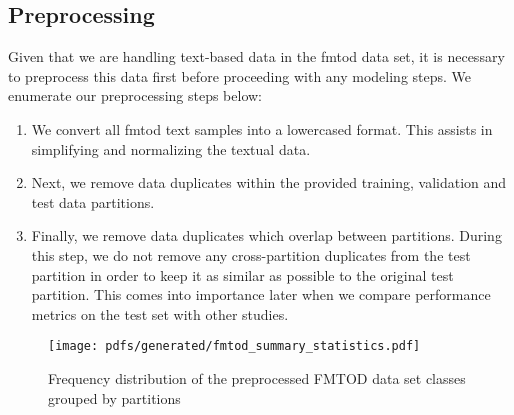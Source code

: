 \subsection{Preprocessing}

Given that we are handling text-based data in the \ac{fmtod} data set, it is
necessary to preprocess this data first before proceeding with any modeling
steps. We enumerate our preprocessing steps below:

\begin{enumerate}{}
  \item We convert all \ac{fmtod} text samples into a lowercased format. This assists
  in simplifying and normalizing the textual data.
  \item Next, we remove data duplicates within the provided training, validation and test
  data partitions.
  \item Finally, we remove data duplicates which overlap between partitions.
  During this step, we do not remove any cross-partition duplicates from the
  test partition in order to keep it as similar as possible to the original test
  partition. This comes into importance later when we compare performance metrics
  on the test set with other studies.
\end{enumerate}

\begin{figure}[t!]
  \centering
  \texttt{[image: pdfs/generated/fmtod\_summary\_statistics.pdf]}
  \caption{Frequency distribution of the preprocessed FMTOD data set classes grouped by
    partitions}
  \label{fig:fmtod}
\end{figure}

